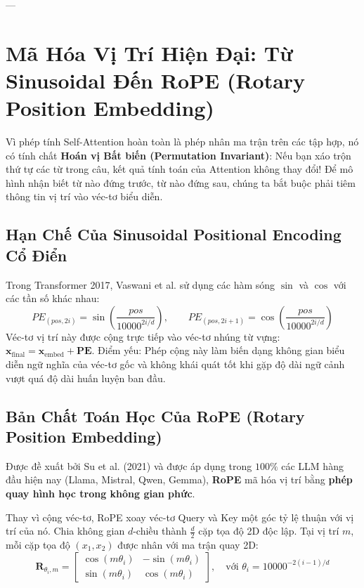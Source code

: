 ---

\section{Mã Hóa Vị Trí Hiện Đại: Từ Sinusoidal Đến RoPE (Rotary Position Embedding)}
\label{sec:rope-deepdive}

Vì phép tính Self-Attention hoàn toàn là phép nhân ma trận trên các tập hợp, nó có tính chất \textbf{Hoán vị Bất biến (Permutation Invariant)}: Nếu bạn xáo trộn thứ tự các từ trong câu, kết quả tính toán của Attention không thay đổi! Để mô hình nhận biết từ nào đứng trước, từ nào đứng sau, chúng ta bắt buộc phải tiêm thông tin vị trí vào véc-tơ biểu diễn.

\subsection{Hạn Chế Của Sinusoidal Positional Encoding Cổ Điển}
Trong Transformer 2017, Vaswani et al. sử dụng các hàm sóng $\sin$ và $\cos$ với các tần số khác nhau:
\begin{equation}
PE_{(pos, 2i)} = \sin\left(\frac{pos}{10000^{2i/d}}\right), \qquad PE_{(pos, 2i+1)} = \cos\left(\frac{pos}{10000^{2i/d}}\right)
\end{equation}
Véc-tơ vị trí này được cộng trực tiếp vào véc-tơ nhúng từ vựng: $\mathbf{x}_{\text{final}} = \mathbf{x}_{\text{embed}} + \mathbf{PE}$.
Điểm yếu: Phép cộng này làm biến dạng không gian biểu diễn ngữ nghĩa của véc-tơ gốc và không khái quát tốt khi gặp độ dài ngữ cảnh vượt quá độ dài huấn luyện ban đầu.

\subsection{Bản Chất Toán Học Của RoPE (Rotary Position Embedding)}
Được đề xuất bởi Su et al. (2021) và được áp dụng trong $100\%$ các LLM hàng đầu hiện nay (Llama, Mistral, Qwen, Gemma), \textbf{RoPE} mã hóa vị trí bằng \textbf{phép quay hình học trong không gian phức}.

Thay vì cộng véc-tơ, RoPE xoay véc-tơ Query và Key một góc tỷ lệ thuận với vị trí của nó. Chia không gian $d$-chiều thành $\frac{d}{2}$ cặp tọa độ 2D độc lập. Tại vị trí $m$, mỗi cặp tọa độ $(x_1, x_2)$ được nhân với ma trận quay 2D:
\begin{equation}
\mathbf{R}_{\theta_i, m} = \begin{bmatrix} \cos(m\theta_i) & -\sin(m\theta_i) \\ \sin(m\theta_i) & \cos(m\theta_i) \end{bmatrix}, \quad \text{với } \theta_i = 10000^{-2(i-1)/d}
\label{eq:rope-2d-matrix}
\end{equation}

